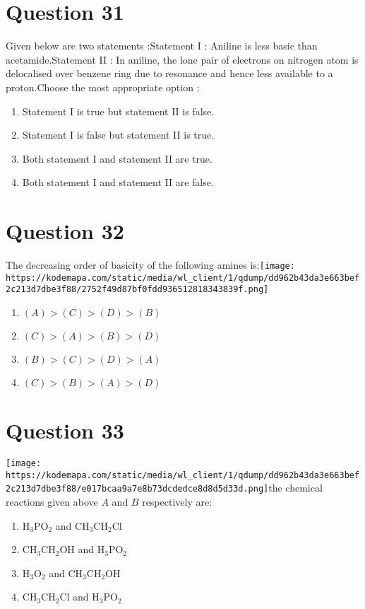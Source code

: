 \documentclass{article}
\begin{document}
\section*{Question 31}
Given below are two statements :Statement I : Aniline is less basic than acetamide.Statement II : In aniline, the lone pair of electrons on nitrogen atom is delocalised over benzene ring due to resonance and hence less available to a proton.Choose the most appropriate option ; 
\begin{enumerate}[label=(\alph*)]
\item Statement I is true but statement II is false.
\item Statement I is false but statement II is true.
\item Both statement I and statement II are true.
\item Both statement I and statement II are false.
\end{enumerate}
\newpage
\section*{Question 32}
The decreasing order of basicity of the following amines is:\texttt{[image: https://kodemapa.com/static/media/wl\_client/1/qdump/dd962b43da3e663bef2c213d7dbe3f88/2752f49d87bf0fdd936512818343839f.png]}\newline
\begin{enumerate}[label=(\alph*)]
\item \((A)>(C)>(D)>(B)\)
\item \((C)>(A)>(B)>(D)\)
\item \((B)>(C)>(D)>(A)\)
\item \((C)>(B)>(A)>(D)\)
\end{enumerate}
\newpage
\section*{Question 33}
\texttt{[image: https://kodemapa.com/static/media/wl\_client/1/qdump/dd962b43da3e663bef2c213d7dbe3f88/e017bcaa9a7e8b73dcdedce8d8d5d33d.png]}\newlineIn the chemical reactions given above \(A\) and \(B\) respectively are: 
\begin{enumerate}[label=(\alph*)]
\item \(\mathrm{H}_3 \mathrm{PO}_2\) and \(\mathrm{CH}_3 \mathrm{CH}_2 \mathrm{Cl}\)
\item \(\mathrm{CH}_3 \mathrm{CH}_2 \mathrm{OH}\) and \(\mathrm{H}_3 \mathrm{PO}_2\)
\item \(\mathrm{H}_3 \mathrm{O}_2\) and \(\mathrm{CH}_3 \mathrm{CH}_2 \mathrm{OH}\)
\item \(\mathrm{CH}_3 \mathrm{CH}_2 \mathrm{Cl}\) and \(\mathrm{H}_3 \mathrm{PO}_2\)
\end{enumerate}
\newpage
\end{document}
